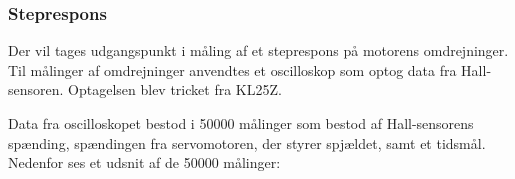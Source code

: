 



\subsubsection{Steprespons}
\label{sec:steprespons}

Der vil tages udgangspunkt i måling af et steprespons på motorens omdrejninger. Til målinger af omdrejninger anvendtes et oscilloskop som optog data fra Hall-sensoren. Optagelsen blev tricket fra KL25Z.%

Data fra oscilloskopet bestod i 50000 målinger som bestod af Hall-sensorens spænding, spændingen fra servomotoren, der styrer spjældet, samt et tidsmål. Nedenfor ses et udsnit af de 50000 målinger:


